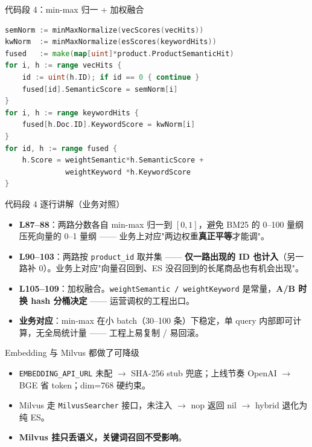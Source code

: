\documentclass[aspectratio=169,11pt]{beamer}
\begin{document}
\begin{frame}{代码段 4：min-max 归一 + 加权融合}
\begin{lstlisting}[language=Go,firstnumber=87,basicstyle=\ttfamily\tiny]
semNorm := minMaxNormalize(vecScores(vecHits))
kwNorm  := minMaxNormalize(esScores(keywordHits))
fused   := make(map[uint]*product.ProductSemanticHit)
for i, h := range vecHits {
    id := uint(h.ID); if id == 0 { continue }
    fused[id].SemanticScore = semNorm[i]
}
for i, h := range keywordHits {
    fused[h.Doc.ID].KeywordScore = kwNorm[i]
}
for id, h := range fused {
    h.Score = weightSemantic*h.SemanticScore +
              weightKeyword *h.KeywordScore
}
\end{lstlisting}
\end{frame}

\begin{frame}[shrink]{代码段 4 逐行讲解（业务对照）}
\begin{itemize}
  \item \textbf{L87--88}：两路分数各自 min-max 归一到 \([0,1]\)，避免 BM25 的 0--100 量纲压死向量的 0--1 量纲 —— 业务上对应"两边权重\textbf{真正平等}才能调"。
  \item \textbf{L90--103}：两路按 \texttt{product\_id} 取并集 —— \textbf{仅一路出现的 ID 也计入}（另一路补 0）。业务上对应"向量召回到、ES 没召回到的长尾商品也有机会出现"。
  \item \textbf{L105--109}：加权融合。\texttt{weightSemantic / weightKeyword} 是常量，\textbf{A/B 时换 hash 分桶决定} —— 运营调权的工程出口。
  \item \textbf{业务对应}：min-max 在小 batch（30--100 条）下稳定，单 query 内部即可计算，无全局统计量 —— 工程上易复制 / 易回滚。
\end{itemize}
\end{frame}

\begin{frame}[shrink]{Embedding 与 Milvus 都做了可降级}
\vspace{1mm}
\small
\begin{itemize}
  \item \texttt{EMBEDDING\_API\_URL} 未配 $\to$ SHA-256 stub 兜底；上线节奏 OpenAI $\to$ BGE 省 token；dim=768 硬约束。
  \item Milvus 走 \texttt{MilvusSearcher} 接口，未注入 $\to$ nop 返回 nil $\to$ hybrid 退化为纯 ES。
  \item \textbf{Milvus 挂只丢语义，关键词召回不受影响}。
\end{itemize}
\end{frame}
\end{document}
